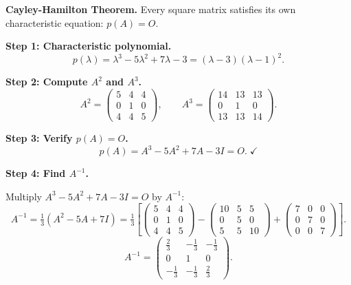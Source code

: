 \documentclass[12pt,a3paper]{article}
\begin{document}
\begin{tcolorbox}[enhanced,breakable,
  colback=cE!4,colframe=cE,boxrule=0.8pt,arc=5pt,
  title={\textbf{Answer --- Cayley-Hamilton; $A^{-1}$, $A^{-2}$, $A^3$ for
    $A=\begin{pmatrix}2&1&1\\0&1&0\\1&1&2\end{pmatrix}$}},
  fonttitle=\bfseries\color{white},colbacktitle=cE]

\textbf{Cayley-Hamilton Theorem.} Every square matrix satisfies its own
characteristic equation: $p(A)=O$.

\textbf{Step 1: Characteristic polynomial.}
\[
  p(\lambda)=\lambda^3-5\lambda^2+7\lambda-3=(\lambda-3)(\lambda-1)^2.
\]

\textbf{Step 2: Compute $A^2$ and $A^3$.}
\[
  A^2=\begin{pmatrix}5&4&4\\0&1&0\\4&4&5\end{pmatrix},\qquad
  A^3=\begin{pmatrix}14&13&13\\0&1&0\\13&13&14\end{pmatrix}.
\]

\textbf{Step 3: Verify $p(A)=O$.}
\[
  p(A)=A^3-5A^2+7A-3I=O.\;\checkmark
\]

\textbf{Step 4: Find $A^{-1}$.}

Multiply $A^3-5A^2+7A-3I=O$ by $A^{-1}$:
\[
  A^{-1}=\tfrac{1}{3}(A^2-5A+7I)
  =\tfrac{1}{3}\!\left[\begin{pmatrix}5&4&4\\0&1&0\\4&4&5\end{pmatrix}
  -\begin{pmatrix}10&5&5\\0&5&0\\5&5&10\end{pmatrix}
  +\begin{pmatrix}7&0&0\\0&7&0\\0&0&7\end{pmatrix}\right].
\]
\[
  \boxed{A^{-1}=\begin{pmatrix}\frac{2}{3}&-\frac{1}{3}&-\frac{1}{3}\\[4pt]
  0&1&0\\[4pt]-\frac{1}{3}&-\frac{1}{3}&\frac{2}{3}\end{pmatrix}.}
\]


\end{tcolorbox}
\end{document}
